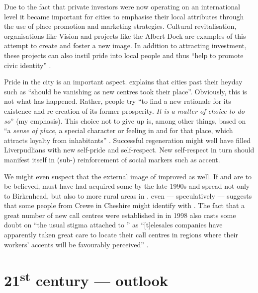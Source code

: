 Due to the fact that private investors were now operating on an international level it became important for cities to emphasise their local attributes through the use of place promotion and marketing strategies.
Cultural revitalisation, organisations like  Vision and  projects like the Albert Dock are examples of this attempt to create and foster a new image.
In addition to attracting investment, these projects can also instil pride into local people and thus ``help to promote civic identity'' \citep[cf.][201--203]{percy2003}.

Pride in the city is an important aspect.
\citet[20]{fraser2003} explains that cities past their heyday such as  ``should be vanishing as new centres took their place''.
Obviously, this is not what has happened.
Rather, people try ``to find a new rationale for its existence and re-creation of its former prosperity. \emph{It is a matter of  choice to do so}'' (my emphasis).
This  choice not to give up is, among other things, based on ``a \emph{sense of place}, a special character or feeling in and for that place, which attracts loyalty from inhabitants'' \citep[23, emphasis in the original]{fraser2003}.
Successful regeneration might well have filled Liverpudlians with new self-pride and self-respect.
New self-respect in turn should manifest itself in (sub-) reinforcement of social markers such as accent.

We might even suspect that the external image of  improved as well.
If \citet[73]{trudgill1999} and \citet[110]{honeybone2007} are to be believed,  must have had acquired some   by the late 1990s and spread not only to Birkenhead, but also to more rural areas in .
\citet[176--177]{montgomery2007a} even --- speculatively --- suggests that some people from Crewe in Cheshire might identify with .
The fact that a great number of new call centres were established in  in 1998 also casts some doubt on ``the usual stigma attached to '' as ``[t]elesales companies have apparently taken great care to locate their call centres in regions where their workers' accents will be favourably perceived'' \citep[3]{foulkesdocherty1999a}.

	\section{21\textsuperscript{st} century --- outlook}\label{sec.hist.21}

